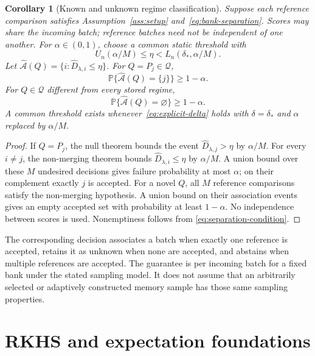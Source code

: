 \documentclass[11pt,a4paper]{article}
\newtheorem{corollary}[theorem]{Corollary}
\theoremstyle{definition}
\theoremstyle{remark}
\newcommand{\Prob}{\mathbb P}
\begin{document}
\begin{corollary}[Known and unknown regime classification]\label{cor:bank}
Suppose each reference comparison satisfies Assumption~\ref{ass:setup}
and~\eqref{eq:bank-separation}. Scores may share the incoming batch;
reference batches need not be independent of one another. For
$\alpha\in(0,1)$, choose a common static threshold with
\begin{equation}\label{eq:bank-threshold}
 U_n(\alpha/M)\le\eta<L_n(\delta_*,\alpha/M).
\end{equation}
Let $\widehat{\mathcal A}(Q)=\{i:\widehat D_{\lambda,i}\le\eta\}$.
For $Q=P_j\in\mathcal Q$,
\begin{equation}\label{eq:known-classification}
 \Prob\{\widehat{\mathcal A}(Q)=\{j\}\}\ge1-\alpha.
\end{equation}
For $Q\in\mathcal Q$ different from every stored regime,
\begin{equation}\label{eq:unknown-classification}
 \Prob\{\widehat{\mathcal A}(Q)=\varnothing\}\ge1-\alpha.
\end{equation}
A common threshold exists whenever~\eqref{eq:explicit-delta} holds
with $\delta=\delta_*$ and $\alpha$ replaced by $\alpha/M$.
\end{corollary}
\begin{proof}
If $Q=P_j$, the null theorem bounds the event
$\widehat D_{\lambda,j}>\eta$ by $\alpha/M$. For every $i\ne j$,
the non-merging theorem bounds $\widehat D_{\lambda,i}\le\eta$
by $\alpha/M$. A union bound over these $M$ undesired decisions gives
failure probability at most $\alpha$; on their complement exactly
$j$ is accepted. For a novel $Q$, all $M$ reference comparisons
satisfy the non-merging hypothesis. A union bound on their association
events gives an empty accepted set with probability at least $1-\alpha$.
No independence between scores is used. Nonemptiness follows from
\eqref{eq:separation-condition}.
\end{proof}
The corresponding decision associates a batch when exactly one
reference is accepted, retains it as unknown when none are accepted,
and abstains when multiple references are accepted. The guarantee
is per incoming batch for a fixed bank under the stated sampling
model. It does not assume that an arbitrarily selected or adaptively
constructed memory sample has those same sampling properties.

\appendix
\section{RKHS and expectation foundations}\label{app:foundations}
\end{document}
